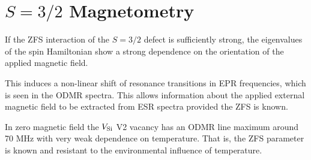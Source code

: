 \lipsum[1-6]
%
%

\cite{Balasubramanian2008}

\section{$S = 3/2$ Magnetometry}
\cite{PhysRevApplied.4.014009}
\cite{PhysRevB.92.115201}
\cite{1505.06914}

If the ZFS interaction of the $S=3/2$ defect is sufficiently strong, the eigenvalues of the
spin Hamiltonian show a strong dependence on the orientation of the applied magnetic field. 

This induces a non-linear shift of resonance transitions in EPR frequencies, which is seen in the ODMR spectra. 
This allows information about the applied external magnetic field to be extracted from ESR spectra provided the ZFS is known. 

In zero magnetic field the $V_{\ce{Si}}$ V2 vacancy has an ODMR line maximum around 70 MHz with very weak dependence on temperature. That is, the ZFS parameter is known and resistant to the environmental influence of temperature. 

